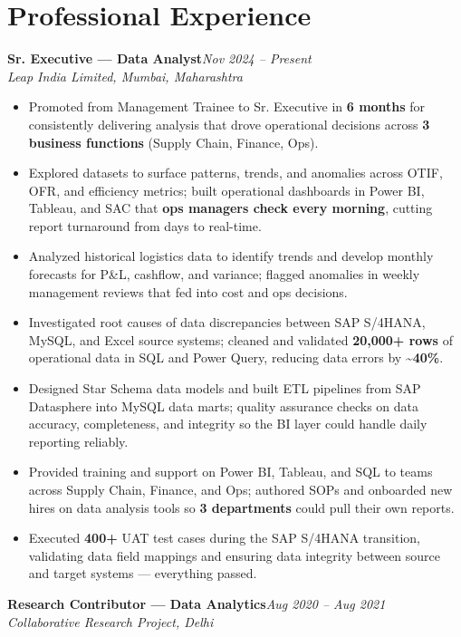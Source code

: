 \documentclass[10pt, letterpaper]{article}
\newcommand{\role}[3]{%
  \vspace{2pt}%
  {\bfseries #1}\hfill{\small\color{muted}\textit{#3}}\\[-2pt]%
  {\small\color{muted}\textit{#2}}%
}
\begin{document}
\section{Professional Experience}

\role{Sr. Executive --- Data Analyst}{Leap India Limited, Mumbai, Maharashtra}{Nov 2024 -- Present}

\begin{itemize}
  \item Promoted from Management Trainee to Sr. Executive in \textbf{6 months} for consistently delivering analysis that drove operational decisions across \textbf{3 business functions} (Supply Chain, Finance, Ops).
  \item Explored datasets to surface patterns, trends, and anomalies across OTIF, OFR, and efficiency metrics; built operational dashboards in Power BI, Tableau, and SAC that \textbf{ops managers check every morning}, cutting report turnaround from days to real-time.
  \item Analyzed historical logistics data to identify trends and develop monthly forecasts for P\&L, cashflow, and variance; flagged anomalies in weekly management reviews that fed into cost and ops decisions.
  \item Investigated root causes of data discrepancies between SAP S/4HANA, MySQL, and Excel source systems; cleaned and validated \textbf{20,000+ rows} of operational data in SQL and Power Query, reducing data errors by \textbf{\textasciitilde40\%}.
  \item Designed Star Schema data models and built ETL pipelines from SAP Datasphere into MySQL data marts; quality assurance checks on data accuracy, completeness, and integrity so the BI layer could handle daily reporting reliably.
  \item Provided training and support on Power BI, Tableau, and SQL to teams across Supply Chain, Finance, and Ops; authored SOPs and onboarded new hires on data analysis tools so \textbf{3 departments} could pull their own reports.
  \item Executed \textbf{400+} UAT test cases during the SAP S/4HANA transition, validating data field mappings and ensuring data integrity between source and target systems --- everything passed.
\end{itemize}

\vspace{1pt}

\role{Research Contributor --- Data Analytics}{Collaborative Research Project, Delhi}{Aug 2020 -- Aug 2021}
\end{document}
